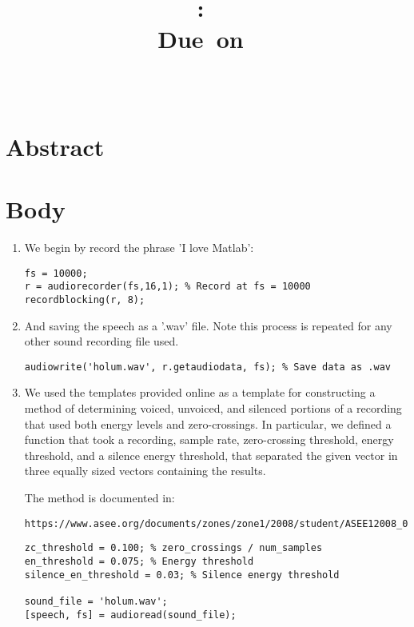 \documentclass[11pt]{article}
\title{
\vspace{2in}
\textmd{\textbf{\hmwkClass:\ \hmwkTitle}}\\
\normalsize\vspace{0.1in}\small{Due\ on\ \hmwkDueDate}\\
\vspace{0.1in}\large{\textit{\hmwkClassInstructor\ \hmwkClassTime}}
\vspace{3in}
}
\author{\textbf{\hmwkAuthorName}}
\date{} %
\begin{document}


\section{Abstract}



\section{Body}

\begin{enumerate} 
\item We begin by record the phrase 'I love Matlab':
\begin{lstlisting} 
fs = 10000;
r = audiorecorder(fs,16,1); % Record at fs = 10000
recordblocking(r, 8);
\end{lstlisting}

\item And saving the speech as a '.wav' file. Note this process is repeated for any other sound recording file used.
\begin{lstlisting}
audiowrite('holum.wav', r.getaudiodata, fs); % Save data as .wav
\end{lstlisting}


\item We used the templates provided online as a template for constructing a method of determining voiced, unvoiced, and silenced portions of a recording that used both energy levels and zero-crossings. In particular, we defined a function that took a recording, sample rate, zero-crossing threshold, energy threshold, and a silence energy threshold, that separated the given vector in three equally sized vectors containing the results.

The method is documented in: 
\begin{verbatim}
https://www.asee.org/documents/zones/zone1/2008/student/ASEE12008_0044_paper.pdf
\end{verbatim}

\begin{lstlisting}
zc_threshold = 0.100; % zero_crossings / num_samples
en_threshold = 0.075; % Energy threshold
silence_en_threshold = 0.03; % Silence energy threshold

sound_file = 'holum.wav';
[speech, fs] = audioread(sound_file);


\end{lstlisting}
\end{enumerate}
\end{document}
